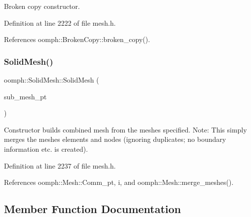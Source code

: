 Broken copy constructor. 



Definition at line 2222 of file mesh.\+h.



References oomph\+::\+Broken\+Copy\+::broken\+\_\+copy().

\mbox{\label{classoomph_1_1SolidMesh_a3768a52eff24c803291af72c51cddf93}} 
\subsubsection{\texorpdfstring{Solid\+Mesh()}{SolidMesh()}\hspace{0.1cm}{\footnotesize\ttfamily [3/3]}}
{\footnotesize\ttfamily oomph\+::\+Solid\+Mesh\+::\+Solid\+Mesh (\begin{DoxyParamCaption}\item[{const \hyperlink{classoomph_1_1Vector}{Vector}$<$ \hyperlink{classoomph_1_1SolidMesh}{Solid\+Mesh} $\ast$$>$ \&}]{sub\+\_\+mesh\+\_\+pt }\end{DoxyParamCaption})\hspace{0.3cm}{\ttfamily [inline]}}



Constructor builds combined mesh from the meshes specified. Note\+: This simply merges the meshes\textquotesingle{} elements and nodes (ignoring duplicates; no boundary information etc. is created). 



Definition at line 2237 of file mesh.\+h.



References oomph\+::\+Mesh\+::\+Comm\+\_\+pt, i, and oomph\+::\+Mesh\+::merge\+\_\+meshes().



\subsection{Member Function Documentation}
\mbox{\label{classoomph_1_1SolidMesh_af2d057e3b0af894bb548bcc73765c414}} 
